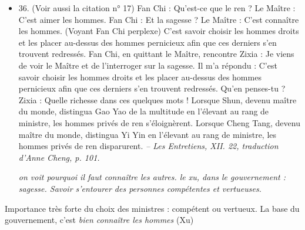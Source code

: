 \begin{itemize}
\item 36. (Voir aussi la citation n° 17)  \newline Fan Chi : Qu’est-ce que le ren ?  \newline Le Maître : C’est aimer les hommes. \newline Fan Chi : Et la sagesse ?  \newline Le Maître : C’est connaître les hommes. (Voyant Fan Chi perplexe) C’est savoir choisir les hommes droits et les placer au-dessus des hommes pernicieux afin que ces derniers s’en trouvent redressés.   Fan Chi, en quittant  le Maître, rencontre Zixia : Je viens de voir  le Maître et de l’interroger sur la sagesse. Il m’a répondu : C’est savoir choisir les hommes droits et les placer au-dessus des hommes pernicieux afin que ces derniers s’en trouvent redressés. Qu’en penses-tu ? \newline Zixia : Quelle richesse dans ces quelques mots ! Lorsque Shun, devenu maître du monde, distingua Gao Yao de la multitude en l’élevant au rang de ministre, les hommes privés de ren s’éloignèrent. Lorsque Cheng Tang, devenu maître du monde, distingua Yi Yin en l’élevant au rang de ministre, les hommes privés de ren disparurent.   \textit{\small -- Les Entretiens, XII. 22, traduction d’Anne Cheng, p. 101.  } 

\textit{on voit pourquoi il faut connaître les autres. le xu, dans le gouvernement : sagesse. Savoir s'entourer des personnes compétentes et vertueuses. }
\end{itemize}

\begin{Prop}
    Importance très forte du choix des ministres : compétent ou vertueux. La base du gouvernement, c'est \textit{bien connaître les hommes} (Xu)
\end{Prop}



